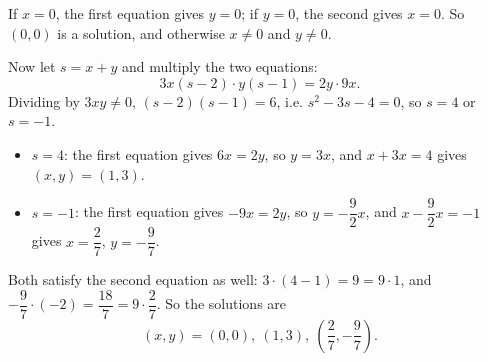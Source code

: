 If $x=0$, the first equation gives $y=0$; if $y=0$, the second gives $x=0$. So $(0,0)$ is a solution, and otherwise $x\ne0$ and $y\ne0$.

Now let $s=x+y$ and multiply the two equations:
\[3x(s-2)\cdot y(s-1)=2y\cdot9x.\]
Dividing by $3xy\ne0$, $(s-2)(s-1)=6$, i.e. $s^2-3s-4=0$, so $s=4$ or $s=-1$.
\begin{itemize}
\item $s=4$: the first equation gives $6x=2y$, so $y=3x$, and $x+3x=4$ gives $(x,y)=(1,3)$.
\item $s=-1$: the first equation gives $-9x=2y$, so $y=-\dfrac92x$, and $x-\dfrac92x=-1$ gives $x=\dfrac27$, $y=-\dfrac97$.
\end{itemize}
Both satisfy the second equation as well: $3\cdot(4-1)=9=9\cdot1$, and $-\dfrac97\cdot(-2)=\dfrac{18}{7}=9\cdot\dfrac27$. So the solutions are
\[\boxed{(x,y)=(0,0),\ (1,3),\ \left(\dfrac27,-\dfrac97\right)}.\]
